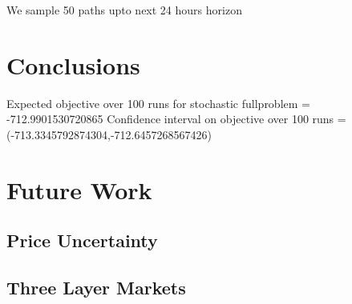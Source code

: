 \documentclass[11pt,twoside]{article}
\begin{document}
We sample 50 paths upto next 24 hours horizon
\section{Conclusions}
Expected objective over 100 runs for stochastic fullproblem = -712.9901530720865
Confidence interval on objective over 100 runs = (-713.3345792874304,-712.6457268567426)

\section{Future Work}

\subsection{Price Uncertainty}

\subsection{Three Layer Markets}




\end{document}
